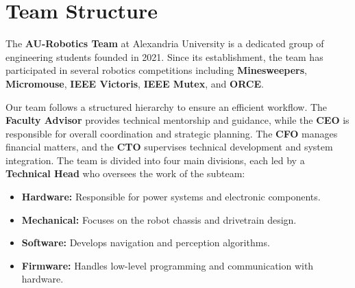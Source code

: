 \documentclass[11pt,a4paper]{article}
\begin{document}


\newpage



\setlength{\columnsep}{1.5cm}
\twocolumn
\section{ Team Structure}
The \textbf{AU-Robotics Team} at Alexandria University is a dedicated group of engineering students founded in 2021. Since its establishment, the team has participated in several robotics competitions including \textbf{Minesweepers}, \textbf{Micromouse}, \textbf{IEEE Victoris}, \textbf{IEEE Mutex}, and \textbf{ORCE}.

Our team follows a structured hierarchy to ensure an efficient workflow. The \textbf{Faculty Advisor} provides technical mentorship and guidance, while the \textbf{CEO} is responsible for overall coordination and strategic planning. The \textbf{CFO} manages financial matters, and the \textbf{CTO} supervises technical development and system integration. The team is divided into four main divisions, each led by a \textbf{Technical Head} who oversees the work of the subteam:
\vspace{-2pt}
\begin{itemize}[left=0pt] 
    \setlength{\itemsep}{0pt}
    \setlength{\parskip}{0pt}
    \setlength{\parsep}{0pt} 
    \item \textbf{Hardware:} Responsible for power systems and electronic components.
    \item \textbf{Mechanical:} Focuses on the robot chassis and drivetrain design.
    \item \textbf{Software:} Develops navigation and perception algorithms.
    \item \textbf{Firmware:} Handles low-level programming and communication with hardware.
\end{itemize}
\vspace{-3pt}
\end{document}
